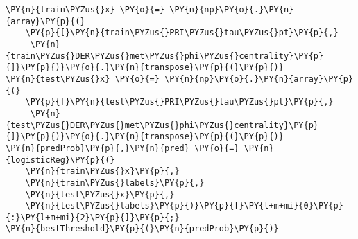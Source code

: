 {\par%
\vspace{-1\baselineskip}%
}%
\begin{notebookcell}[]%
\begin{addmargin}[\cellleftmargin]{0em}%
{\smaller%
\par%
%
\vspace{-1\smallerfontscale}%
\begin{Verbatim}[commandchars=\\\{\}]
\PY{n}{train\PYZus{}x} \PY{o}{=} \PY{n}{np}\PY{o}{.}\PY{n}{array}\PY{p}{(}
    \PY{p}{[}\PY{n}{train\PYZus{}PRI\PYZus{}tau\PYZus{}pt}\PY{p}{,}
     \PY{n}{train\PYZus{}DER\PYZus{}met\PYZus{}phi\PYZus{}centrality}\PY{p}{]}\PY{p}{)}\PY{o}{.}\PY{n}{transpose}\PY{p}{(}\PY{p}{)}
\PY{n}{test\PYZus{}x} \PY{o}{=} \PY{n}{np}\PY{o}{.}\PY{n}{array}\PY{p}{(}
    \PY{p}{[}\PY{n}{test\PYZus{}PRI\PYZus{}tau\PYZus{}pt}\PY{p}{,}
     \PY{n}{test\PYZus{}DER\PYZus{}met\PYZus{}phi\PYZus{}centrality}\PY{p}{]}\PY{p}{)}\PY{o}{.}\PY{n}{transpose}\PY{p}{(}\PY{p}{)}
\PY{n}{predProb}\PY{p}{,}\PY{n}{pred} \PY{o}{=} \PY{n}{logisticReg}\PY{p}{(}
    \PY{n}{train\PYZus{}x}\PY{p}{,}
    \PY{n}{train\PYZus{}labels}\PY{p}{,}
    \PY{n}{test\PYZus{}x}\PY{p}{,}
    \PY{n}{test\PYZus{}labels}\PY{p}{)}\PY{p}{[}\PY{l+m+mi}{0}\PY{p}{:}\PY{l+m+mi}{2}\PY{p}{]}\PY{p}{;}
\PY{n}{bestThreshold}\PY{p}{(}\PY{n}{predProb}\PY{p}{)}
\end{Verbatim}
%
\par%
\vspace{-1\smallerfontscale}}%
\end{addmargin}
\end{notebookcell}




